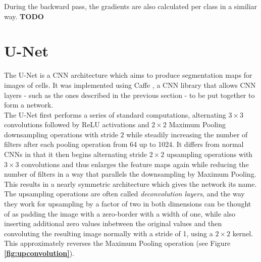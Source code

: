During the backward pass, the gradients are also calculated per class in a similiar way. \textbf{TODO}


	\section {U-Net}
\label{sec:unet}
The U-Net \cite{unet} is a CNN architecture which aims to produce segmentation maps for images of cells. It was implemented using Caffe \cite{caffe}, a CNN library that allows CNN layers - such as the ones described in the previous section - to be put together to form a network.\\

The U-Net first performs a series of standard computations, alternating $3 \times 3$ convolutions followed by ReLU activations and $2 \times 2$ Maximum Pooling downsampling operations with stride $2$ while steadily increasing the number of filters after each pooling operation from 64 up to 1024. It differs from normal CNNs in that it then begins alternating stride $2 \times 2$ upsampling operations with $3 \times 3$ convolutions and thus enlarges the feature maps again while reducing the number of filters in a way that parallels the downsampling by Maximum Pooling. This results in a nearly symmetric architecture which gives the network its name. The upsampling operations are often called \textit{deconvolution layers}, and the way they work for upsampling by a factor of two in both dimensions can be thought of as padding the image with a zero-border with a width of one, while also inserting additional zero values inbetween the original values and then convoluting the resulting image normally with a stride of 1, using a $2 \times 2$ kernel. This approximately reverses the Maximum Pooling operation (see Figure \textbf{\ref{fig:upconvolution}}). \cite[p. 14]{transposed_conv}\cite{up_conv}

